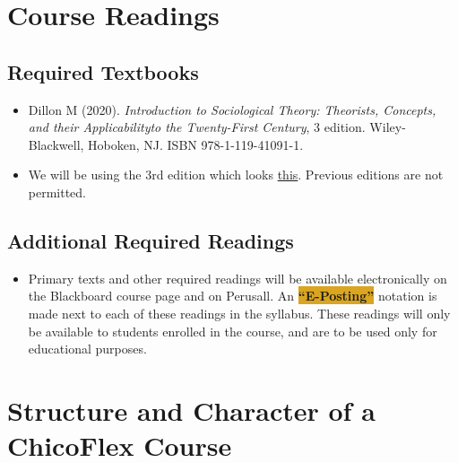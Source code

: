 \documentclass[11pt,]{article}
\providecommand{\tightlist}{%
  \setlength{\itemsep}{0pt}\setlength{\parskip}{0pt}}
\begin{document}
\hypertarget{course-readings}{%
\section{Course Readings}\label{course-readings}}

\hypertarget{required-textbooks}{%
\subsection{Required Textbooks}\label{required-textbooks}}

\begin{itemize}
\item
  Dillon M (2020). \emph{Introduction to Sociological Theory: Theorists,
  Concepts, and their Applicabilityto the Twenty-First Century}, 3
  edition. Wiley-Blackwell, Hoboken, NJ. ISBN 978-1-119-41091-1.
\item
  We will be using the 3rd edition which looks
  \href{https://www.abebooks.com/Introduction-Sociological-Theory-Theorists-Concepts-Applicability/31208296728/bd?cm_mmc=ggl-_-US_Shopp_Textbook-_-product_id=COM9781119410911USED-_-keyword=\&gclid=Cj0KCQjwuO6WBhDLARIsAIdeyDLJvr2N_LKW1qd-49HuMemlLuCRQT4yR3PKWnmeqMDWBDwy9LNFFRUaAlcyEALw_wcB}{this}.
  Previous editions are not permitted.
\end{itemize}

\hypertarget{additional-required-readings}{%
\subsection{Additional Required
Readings}\label{additional-required-readings}}

\begin{itemize}
\tightlist
\item
  Primary texts and other required readings will be available
  electronically on the Blackboard course page and on Perusall. An
  \colorbox{Goldenrod}{\bf{“E-Posting”}} notation is made next to each
  of these readings in the syllabus. These readings will only be
  available to students enrolled in the course, and are to be used only
  for educational purposes.
\end{itemize}

\hypertarget{structure-and-character-of-a-chicoflex-course}{%
\section{Structure and Character of a ChicoFlex
Course}\label{structure-and-character-of-a-chicoflex-course}}
\end{document}
